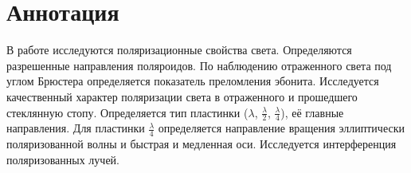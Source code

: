 \section*{Аннотация}

В работе исследуются поляризационные свойства света. Определяются разрешенные направления поляроидов. По наблюдению отраженного света под углом Брюстера определяется показатель преломления эбонита. Исследуется качественный характер поляризации света в отраженного и прошедшего стеклянную стопу. Определяется тип пластинки ($\lambda$, $\frac{\lambda}{2}$, $\frac{\lambda}{4}$), её главные направления. Для пластинки $\frac{\lambda}{4}$ определяется направление вращения эллиптически поляризованной волны и быстрая и медленная оси. Исследуется интерференция поляризованных лучей.